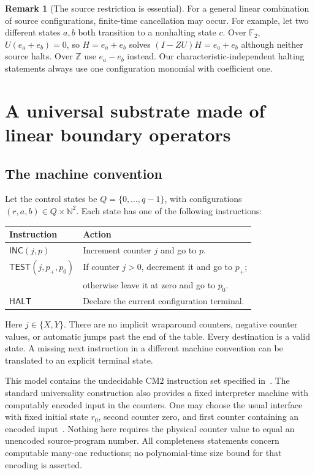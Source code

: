\documentclass[11pt,letterpaper]{article}
\numberwithin{equation}{section}
\theoremstyle{definition}
\newtheorem{remark}[theorem]{Remark}
\newcommand{\N}{\mathbb N}
\newcommand{\Z}{\mathbb Z}
\newcommand{\Fbb}{\mathbb F}
\newcommand{\inc}{\mathsf{INC}}
\newcommand{\test}{\mathsf{TEST}}
\newcommand{\halt}{\mathsf{HALT}}
\begin{document}
\begin{remark}[The source restriction is essential]\label{pwh:bt:rem:multisource}
For a general linear combination of source configurations,
finite-time cancellation may occur. For example, let two different
states $a,b$ both transition to a nonhalting state $c$. Over $\Fbb_2$,
$U(e_a+e_b)=0$, so $H=e_a+e_b$ solves
$(I-ZU)H=e_a+e_b$ although neither source halts. Over $\Z$ use
$e_a-e_b$ instead. Our characteristic-independent halting statements
always use one configuration monomial with coefficient one.
\end{remark}

\section{A universal substrate made of linear boundary operators}\label{pwh:bt:sec:substrate}

\subsection{The machine convention}
Let the control states be $Q=\{0,\ldots,q-1\}$, with configurations
$(r,a,b)\in Q\times\N^2$. Each state has one of the following instructions:
\begin{center}
\begin{tabular}{@{}ll@{}}
\toprule
Instruction & Action\\
\midrule
$\inc(j,p)$ & Increment counter $j$ and go to $p$.\\
$\test(j,p_+,p_0)$ & If counter $j>0$, decrement it and go to $p_+$;\\
 & otherwise leave it at zero and go to $p_0$.\\
$\halt$ & Declare the current configuration terminal.\\
\bottomrule
\end{tabular}
\end{center}
Here $j\in\{X,Y\}$. There are no implicit wraparound counters, negative
counter values, or automatic jumps past the end of the table. Every
destination is a valid state. A missing next instruction in a different
machine convention can be translated to an explicit terminal state.

This model contains the undecidable $\mathrm{CM2}$ instruction set
specified in~\cite{bt:dudenhefner}. The standard universality construction
also provides a fixed interpreter machine with computably encoded input
in the counters. One may choose the usual interface with fixed initial
state $r_0$, second counter zero, and first counter containing an encoded
input~\cite{bt:minsky,bt:dudenhefner}. Nothing here requires the physical
counter value to equal an unencoded source-program number. All
completeness statements concern computable many-one reductions; no
polynomial-time size bound for that encoding is asserted.
\end{document}
